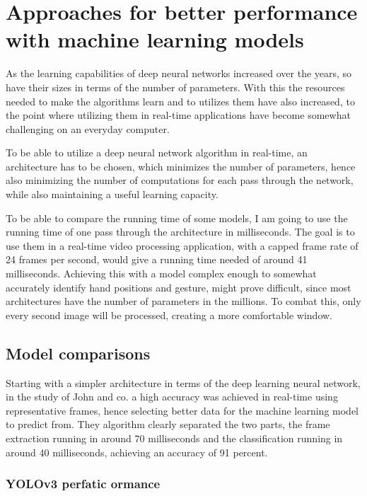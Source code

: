 \chapter{Approaches for better performance with machine learning models}
\label{chap:preformance}

\par As the learning capabilities of deep neural networks increased over the years, so have their sizes in terms of the number of parameters. With this the resources needed to make the algorithms learn and to utilizes them have also increased, to the point where utilizing them in real-time applications have become somewhat challenging on an everyday computer.
\par To be able to utilize a deep neural network algorithm in real-time, an architecture has to be chosen, which minimizes the number of parameters, hence also minimizing the number of computations for each pass through the network, while also maintaining a useful learning capacity.
\par To be able to compare the running time of some models, I am going to use the running time of one pass through the architecture in milliseconds. The goal is to use them in a real-time video processing application, with a capped frame rate of 24 frames per second, would give a running time needed of around 41 milliseconds. Achieving this with a model complex enough to somewhat accurately identify hand positions and gesture, might prove difficult, since most architectures have the number of parameters in the millions. To combat this, only every second image will be processed, creating a more comfortable window.

\section{Model comparisons}
\label{subsec:preformancesec1}

\par Starting with a simpler architecture in terms of the deep learning neural network, in the study of John and co. \cite{john2016} a high accuracy was achieved in real-time using representative frames, hence selecting better data for the machine learning model to predict from. They algorithm clearly separated the two parts, the frame extraction running in  around 70 milliseconds and the classification running in around 40 milliseconds, achieving an accuracy of 91 percent.

\subsection{YOLOv3 perfatic ormance}
\label{subsec:preformancesec1subsec1}

